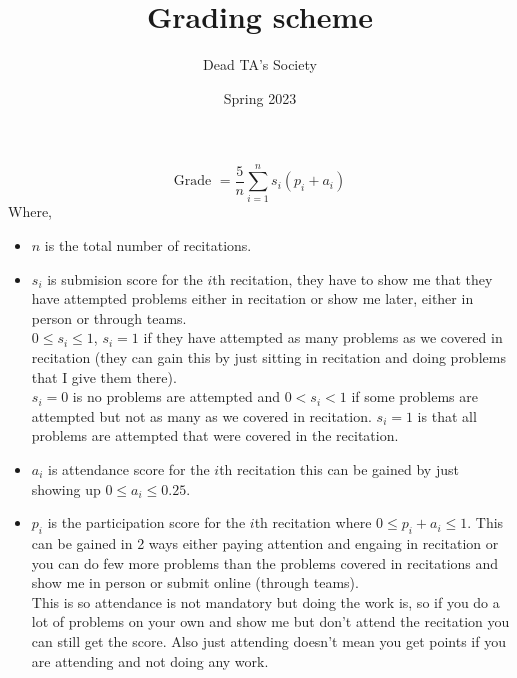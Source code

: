 \documentclass{article}
\title{Grading scheme}
\author{Dead TA's Society}
\date{Spring 2023}
\begin{document}
\maketitle

$$\text{Grade } = \frac{5}{n}\sum_{i=1}^{n}s_i(p_i+a_i)$$
Where,
\begin{itemize}
    \item $n$ is the total number of recitations.
    \item $s_i$ is submision score for the $i$th recitation, they have to show me that they have attempted problems either in recitation or show me later, either in person or through teams. \\
    $ 0\leq s_i \leq 1 $, $ s_i = 1 $ if they have attempted as many problems as we covered in recitation (they can gain this by just sitting in recitation and doing problems that I give them there). \\
    $ s_i=0 $ is no problems are attempted and $ 0 < s_i < 1 $ if some problems are attempted but not as many as we covered in recitation. $ s_i = 1 $ is that all problems are attempted that were covered in the recitation.
    \item $ a_i $ is attendance score for the $ i $th recitation this can be gained by just showing up $ 0\leq a_i \leq 0.25 $. 
    \item $ p_i $ is the participation score for the $ i $th recitation where $ 0\leq p_i+a_i \leq 1 $. This can be gained in 2 ways either paying attention and engaing in recitation or you can do few more problems than the problems covered in recitations and show me in person or submit online (through teams). \\
    This is so attendance is not mandatory but doing the work is, so if you do a lot of problems on your own and show me but don't attend the recitation you can still get the score. Also just attending doesn't mean you get points if you are attending and not doing any work.
\end{itemize}
\end{document}
